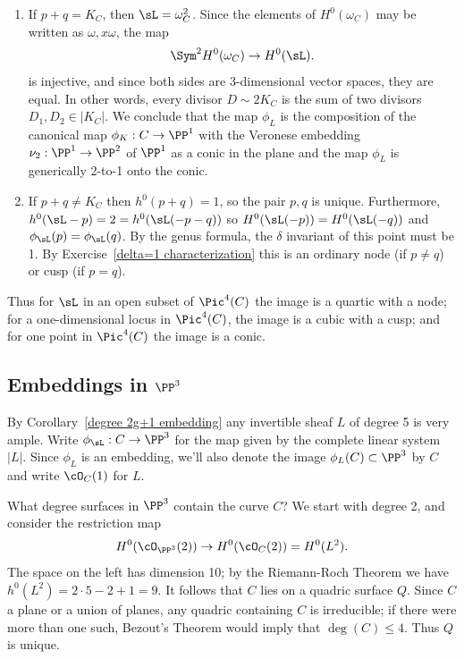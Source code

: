 \begin{enumerate}
\item If $p+q =  K_C$, then $\sL = \omega_C^2$. Since
the elements of $H^0(\omega_C)$ may be written as $\omega, x\omega$, the map
$$
\Sym^2 H^0(\omega_C) \to H^0(\sL).
$$
 is injective, and since both sides are 3-dimensional vector spaces, they are equal. In other words, every divisor $D \sim 2K_C$ is the sum of two divisors $D_1, D_2 \in |K_C|$. We conclude that the map $\phi_L$ is the composition of the canonical map $\phi_K : C \to \PP^1$ with the Veronese embedding $\nu_2 : \PP^1 \to \PP^2$ of $\PP^1$ as a conic in the plane and the map $\phi_L$ is generically 2-to-1 onto the conic.

\item \label{p+q not g12} If $p+q \neq  K_C$  then $h^0(p+q) = 1$, so the pair $p,q$ is unique. Furthermore,
 $h^0(\sL-p) = 2 =  h^0(\sL(-p-q))$ so 
 $H^0(\sL(-p)) = H^0(\sL(-q))$ and $\phi_\sL(p) = \phi_\sL(q)$. 
By the genus formula, the $\delta$ invariant of this point must be 1. By Exercise~\ref{delta=1 characterization}
 this is an ordinary node (if $p\neq q$) or cusp (if $p=q$).

\end{enumerate}

Thus  for $\sL$ in an open subset of $\Pic^4(C)$ the image is a quartic with a node; for a one-dimensional locus in $\Pic^4(C)$, the image is a cubic with a cusp; and for one point in $\Pic^4(C)$ the image is a conic.

\subsection{Embeddings in $\PP^3$}

By Corollary~\ref{degree 2g+1 embedding} any invertible sheaf $L$ of degree 5 is very ample. 
Write $\phi_\sL : C \to \PP^3$ for the map given by the complete linear system $|L|$. Since $\phi_L$ is an embedding, we'll also denote the image $\phi_L(C) \subset \PP^3$ by $C$ and write $\cO_C(1)$ for $L$.

What degree surfaces in $\PP^3$ contain the curve $C$? We start with degree 2, and consider the restriction map
$$
H^0(\cO_{\PP^3}(2)) \to H^0(\cO_C(2)) = H^0(L^2).
$$
The space on the left has dimension 10; by the Riemann-Roch Theorem we have $h^0(L^2) = 2\cdot5 - 2 + 1 = 9$. It follows that $C$ lies on a quadric surface $Q$. Since $C$ a plane or a union of planes, any quadric containing $C$ is irreducible; if there were more than one such, Bezout's Theorem would imply that $\deg(C) \leq 4$. Thus $Q$ is unique.

